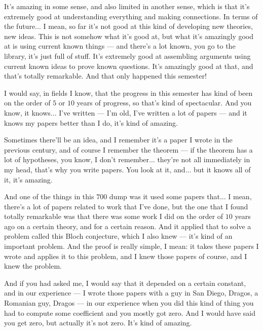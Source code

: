 \begin{speech}[00:43:31 - 00:45:31]
It's amazing in some sense, and also limited in another sense, which is that it's extremely good at understanding everything and making connections. In terms of the future... I mean, so far it's not good at this kind of developing new theories, new ideas. This is not somehow what it's good at, but what it's amazingly good at is using current known things --- and there's a lot known, you go to the library, it's just full of stuff. It's extremely good at assembling arguments using current known ideas to prove known questions. It's amazingly good at that, and that's totally remarkable. And that only happened this semester!

I would say, in fields I know, that the progress in this semester has kind of been on the order of $5$ or $10$ years of progress, so that's kind of spectacular. And you know, it knows... I've written --- I'm old, I've written a lot of papers --- and it knows my papers better than I do, it's kind of amazing.

Sometimes there'll be an idea, and I remember it's a paper I wrote in the previous century, and of course I remember the theorem --- if the theorem has a lot of hypotheses, you know, I don't remember... they're not all immediately in my head, that's why you write papers. You look at it, and... but it knows all of it, it's amazing.

And one of the things in this $700$ dump was it used some papers that... I mean, there's a lot of papers related to work that I've done, but the one that I found totally remarkable was that there was some work I did on the order of $10$ years ago on a certain theory, and for a certain reason. And it applied that to solve a problem called this Bloch conjecture, which I also knew --- it's kind of an important problem. And the proof is really simple, I mean: it takes these papers I wrote and applies it to this problem, and I knew those papers of course, and I knew the problem.

And if you had asked me,  I would say that it depended on a certain constant, and in our experience --- I wrote those papers with a guy in San Diego, Dragos, a Romanian guy, Dragos --- in our experience when you did this kind of thing you had to compute some coefficient and you mostly got zero. And I would have said you get zero, but actually it's not zero. It's kind of amazing.
\end{speech}

